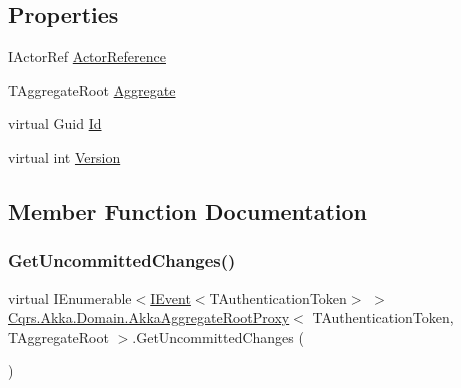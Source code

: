 \subsection*{Properties}
\begin{DoxyCompactItemize}
\item 
I\+Actor\+Ref \hyperlink{classCqrs_1_1Akka_1_1Domain_1_1AkkaAggregateRootProxy_ad85e7a51c716484df8e5e8ea9ff31351_ad85e7a51c716484df8e5e8ea9ff31351}{Actor\+Reference}
\item 
T\+Aggregate\+Root \hyperlink{classCqrs_1_1Akka_1_1Domain_1_1AkkaAggregateRootProxy_a45e41e24822f4a9a8077e10c153de163_a45e41e24822f4a9a8077e10c153de163}{Aggregate}
\item 
virtual Guid \hyperlink{classCqrs_1_1Akka_1_1Domain_1_1AkkaAggregateRootProxy_a7854104312b6088a2c604b334433b633_a7854104312b6088a2c604b334433b633}{Id}
\item 
virtual int \hyperlink{classCqrs_1_1Akka_1_1Domain_1_1AkkaAggregateRootProxy_a24ff2ddef0d416ac5b936c1887ac2154_a24ff2ddef0d416ac5b936c1887ac2154}{Version}
\end{DoxyCompactItemize}


\subsection{Member Function Documentation}
\mbox{\label{classCqrs_1_1Akka_1_1Domain_1_1AkkaAggregateRootProxy_afa620ced4762b0539da23ca063fed489_afa620ced4762b0539da23ca063fed489}} 
\subsubsection{\texorpdfstring{Get\+Uncommitted\+Changes()}{GetUncommittedChanges()}}
{\footnotesize\ttfamily virtual I\+Enumerable$<$\hyperlink{interfaceCqrs_1_1Events_1_1IEvent}{I\+Event}$<$T\+Authentication\+Token$>$ $>$ \hyperlink{classCqrs_1_1Akka_1_1Domain_1_1AkkaAggregateRootProxy}{Cqrs.\+Akka.\+Domain.\+Akka\+Aggregate\+Root\+Proxy}$<$ T\+Authentication\+Token, T\+Aggregate\+Root $>$.Get\+Uncommitted\+Changes (\begin{DoxyParamCaption}{ }\end{DoxyParamCaption})\hspace{0.3cm}{\ttfamily [virtual]}}



